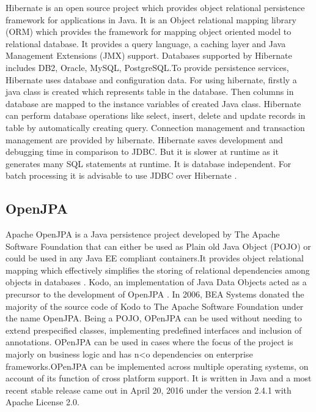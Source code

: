      Hibernate is an open source project which provides object
     relational persistence framework for applications in Java. It is
     an Object relational mapping library (ORM) which provides the
     framework for mapping object oriented model to relational
     database. It provides a query language, a caching layer and Java
     Management Extensions (JMX) support. Databases supported by
     Hibernate includes DB2, Oracle, MySQL, PostgreSQL.To provide
     persistence services, Hibernate uses database and configuration
     data. For using hibernate, firstly a java class is created which
     represents table in the database. Then columns in database are
     mapped to the instance variables of created Java class. Hibernate
     can perform database operations like select, insert, delete and
     update records in table by automatically creating
     query. Connection management and transaction management are
     provided by hibernate.  Hibernate saves development and debugging
     time in comparison to JDBC.  But it is slower at runtime as it
     generates many SQL statements at runtime. It is database
     independent. For batch processing it is advisable to use JDBC
     over Hibernate \cite{www-hibernate}.

\subsection{OpenJPA}

     Apache OpenJPA is a Java
     persistence project developed by The Apache Software Foundation that
     can either be used as Plain old Java Object (POJO) or could be used in
     any Java EE compliant containers.It provides object relational mapping
     which effectively simplifies the storing of relational dependencies
     among objects in databases \cite{www-openjpa}.
     Kodo, an implementation of Java Data Objects acted as a precursor to
     the development of OpenJPA \cite{www-openjpa-wiki}. In 2006, BEA
     Systems donated the majority
     of the source code of Kodo to The Apache Software Foundation under the
     name OpenJPA. Being a POJO, OPenJPA can be used without needing to
     extend prespecified classes, implementing predefined interfaces and
     inclusion of annotations. OPenJPA can be used in cases where the focus
     of the project is majorly on business logic and has n<o dependencies on
     enterprise frameworks.OPenJPA can be implemented across multiple
     operating systems, on account of its function of cross platform
     support. It is written in Java and a most recent stable release came
     out in April 20, 2016 under the version 2.4.1 with Apache License 2.0.

